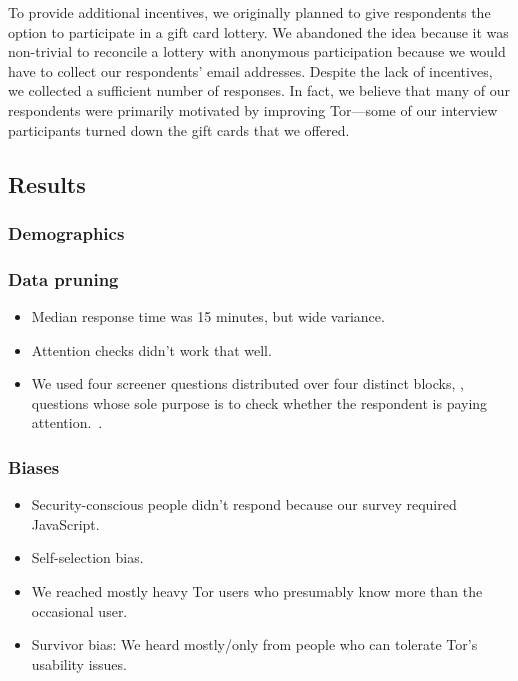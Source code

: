 To provide additional incentives, we originally planned to give respondents the
option to participate in a gift card lottery.  We abandoned the idea because it
was non-trivial to reconcile a lottery with anonymous participation because we
would have to collect our respondents' email addresses.  Despite the lack of
incentives, we collected a sufficient number of responses.  In fact, we believe
that many of our respondents were primarily motivated by improving Tor---some of
our interview participants turned down the gift cards that we offered.

\subsection{Results}
\label{sec:results}

\subsubsection{Demographics}

\subsubsection{Data pruning}
\begin{itemize}
    \item Median response time was 15 minutes, but wide variance.
    \item Attention checks didn't work that well.
    \item We used four screener questions distributed over four distinct
        blocks, \ie, questions whose sole purpose is to check whether the
        respondent is paying attention.~\cite{Berinsky2014a}.
\end{itemize}

\subsubsection{Biases}
\begin{itemize}
    \item Security-conscious people didn't respond because our survey required
        JavaScript.
    \item Self-selection bias.
    \item We reached mostly heavy Tor users who presumably know more than the
        occasional user.
    \item Survivor bias: We heard mostly/only from people who can tolerate Tor's
        usability issues.
\end{itemize}

